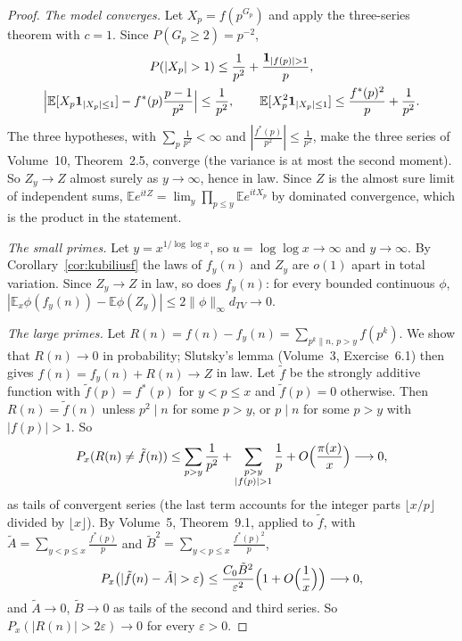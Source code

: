 \begin{proof}
\emph{The model converges.} Let $X_p=f(p^{G_p})$ and apply the three-series theorem with $c=1$. Since $P(G_p\ge2)=p^{-2}$,
\[
\begin{gathered}P(|X_p|>1)\le\frac1{p^2}+\frac{\mathbf 1_{|f(p)|>1}}p,\\\Bigl|\mathbb E[X_p\mathbf 1_{|X_p|\le1}]-f^*(p)\frac{p-1}{p^2}\Bigr|\le\frac1{p^2},\qquad\mathbb E[X_p^2\mathbf 1_{|X_p|\le1}]\le\frac{f^*(p)^2}p+\frac1{p^2}.\end{gathered}
\]
The three hypotheses, with $\sum_p\frac1{p^2}<\infty$ and $|\frac{f^*(p)}{p^2}|\le\frac1{p^2}$, make the three series of Volume~10, Theorem~2.5, converge (the variance is at most the second moment). So $Z_y\to Z$ almost surely as $y\to\infty$, hence in law. Since $Z$ is the almost sure limit of independent sums, $\mathbb Ee^{itZ}=\lim_y\prod_{p\le y}\mathbb Ee^{itX_p}$ by dominated convergence, which is the product in the statement.

\emph{The small primes.} Let $y=x^{1/\log\log x}$, so $u=\log\log x\to\infty$ and $y\to\infty$. By Corollary~\ref{cor:kubiliusf} the laws of $f_y(n)$ and $Z_y$ are $o(1)$ apart in total variation. Since $Z_y\to Z$ in law, so does $f_y(n)$: for every bounded continuous $\phi$, $|\mathbb E_x\phi(f_y(n))-\mathbb E\phi(Z_y)|\le2\|\phi\|_\infty d_{TV}\to0$.

\emph{The large primes.} Let $R(n)=f(n)-f_y(n)=\sum_{p^k\parallel n,\,p>y}f(p^k)$. We show that $R(n)\to0$ in probability; Slutsky's lemma (Volume~3, Exercise~6.1) then gives $f(n)=f_y(n)+R(n)\to Z$ in law. Let $\tilde f$ be the strongly additive function with $\tilde f(p)=f^*(p)$ for $y<p\le x$ and $\tilde f(p)=0$ otherwise. Then $R(n)=\tilde f(n)$ unless $p^2\mid n$ for some $p>y$, or $p\mid n$ for some $p>y$ with $|f(p)|>1$. So
\[
P_x(R(n)\ne\tilde f(n))\le\sum_{p>y}\frac1{p^2}+\sum_{\substack{p>y\\|f(p)|>1}}\frac1p+O\Bigl(\frac{\pi(x)}x\Bigr)\longrightarrow0,
\]
as tails of convergent series (the last term accounts for the integer parts $\lfloor x/p\rfloor$ divided by $\lfloor x\rfloor$). By Volume~5, Theorem~9.1, applied to $\tilde f$, with $\tilde A=\sum_{y<p\le x}\frac{f^*(p)}p$ and $\tilde B^2=\sum_{y<p\le x}\frac{f^*(p)^2}p$,
\[
P_x\bigl(|\tilde f(n)-\tilde A|>\varepsilon\bigr)\le\frac{C_0\tilde B^2}{\varepsilon^2}\Bigl(1+O\Bigl(\frac1x\Bigr)\Bigr)\longrightarrow0,
\]
and $\tilde A\to0$, $\tilde B\to0$ as tails of the second and third series. So $P_x(|R(n)|>2\varepsilon)\to0$ for every $\varepsilon>0$.
\end{proof}

